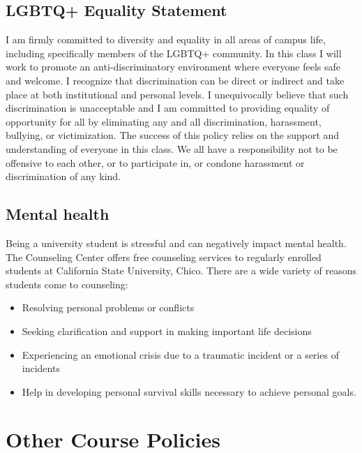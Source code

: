 \documentclass[11pt,]{article}
\providecommand{\tightlist}{%
  \setlength{\itemsep}{0pt}\setlength{\parskip}{0pt}}
\begin{document}
\hypertarget{lgbtq-equality-statement}{%
\subsection{LGBTQ+ Equality Statement}\label{lgbtq-equality-statement}}

I am firmly committed to diversity and equality in all areas of campus
life, including specifically members of the LGBTQ+ community. In this
class I will work to promote an anti-discriminatory environment where
everyone feels safe and welcome. I recognize that discrimination can be
direct or indirect and take place at both institutional and personal
levels. I unequivocally believe that such discrimination is unacceptable
and I am committed to providing equality of opportunity for all by
eliminating any and all discrimination, harassment, bullying, or
victimization. The success of this policy relies on the support and
understanding of everyone in this class. We all have a responsibility
not to be offensive to each other, or to participate in, or condone
harassment or discrimination of any kind.

\hypertarget{mental-health}{%
\subsection{Mental health}\label{mental-health}}

Being a university student is stressful and can negatively impact mental
health. The Counseling Center offers free counseling services to
regularly enrolled students at California State University, Chico. There
are a wide variety of reasons students come to counseling:

\begin{itemize}
\tightlist
\item
  Resolving personal problems or conflicts
\item
  Seeking clarification and support in making important life decisions
\item
  Experiencing an emotional crisis due to a traumatic incident or a
  series of incidents
\item
  Help in developing personal survival skills necessary to achieve
  personal goals.
\end{itemize}

\hypertarget{other-course-policies}{%
\section{Other Course Policies}\label{other-course-policies}}
\end{document}
